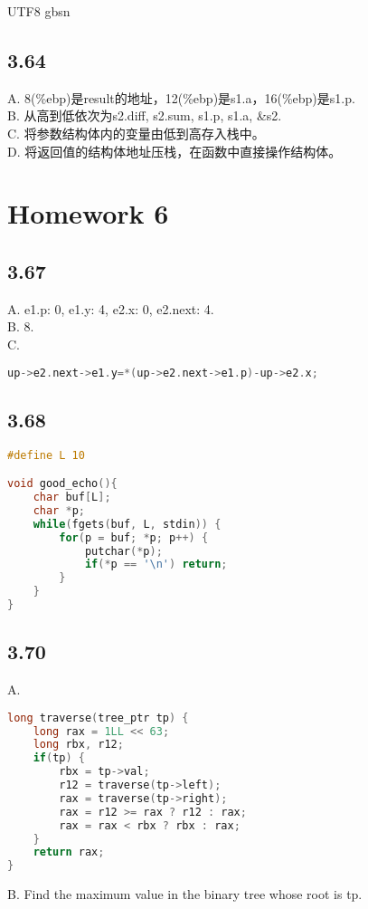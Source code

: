 \documentclass {article}
\begin{document}
\begin {CJK*} {UTF8} {gbsn}
			\subsection{3.64}
				A. 8(\%ebp)是result的地址，12(\%ebp)是s1.a，16(\%ebp)是s1.p.\\

				B. 从高到低依次为s2.diff, s2.sum, s1.p, s1.a, \&s2.\\

				C. 将参数结构体内的变量由低到高存入栈中。\\

				D. 将返回值的结构体地址压栈，在函数中直接操作结构体。\\

		\section{Homework 6}
			\subsection{3.67}
				A. e1.p: 0, e1.y: 4, e2.x: 0, e2.next: 4.\\

				B. 8.\\

				C.
				\begin{lstlisting}[language=C]
up->e2.next->e1.y=*(up->e2.next->e1.p)-up->e2.x;
				\end{lstlisting}

			\subsection{3.68}
				\begin{lstlisting}[language=C]
#define L 10

void good_echo(){
	char buf[L];
	char *p;
	while(fgets(buf, L, stdin)) {
		for(p = buf; *p; p++) {
			putchar(*p);
			if(*p == '\n') return;
		}
	}
}
				\end{lstlisting}

			\subsection{3.70}
				A.
				\begin{lstlisting}[language=C]
long traverse(tree_ptr tp) {
	long rax = 1LL << 63;
	long rbx, r12;
	if(tp) {
		rbx = tp->val;
		r12 = traverse(tp->left);
		rax = traverse(tp->right);
		rax = r12 >= rax ? r12 : rax;
		rax = rax < rbx ? rbx : rax;
	}
	return rax;
}
				\end{lstlisting}

				B. Find the maximum value in the binary tree whose root is tp.\\

	\end {CJK*}
\end{document}
